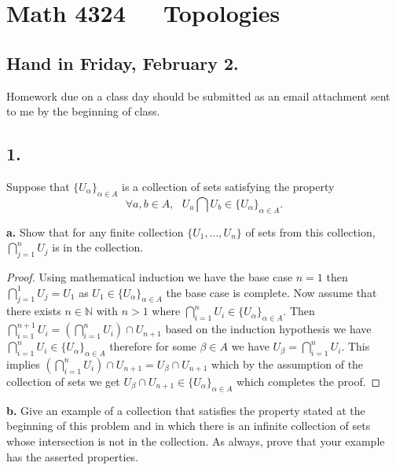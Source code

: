 \documentclass{amsart}
\theoremstyle{plain}
\theoremstyle{definition}
\theoremstyle{remark}
\begin{document}
\section*{Math 4324\ \ \  Topologies }

\subsection*{Hand in Friday, February 2.} Homework due on a class day should be submitted as an email attachment sent to me by the beginning of class.



\vspace{.15in}


\noindent
\subsection*{1.}  Suppose that $\{ U_{\alpha} \} _{\alpha \in A}$ is a collection of sets satisfying the property
\[
    \forall a, b \in A, \ \ \ U_a \bigcap U_b \in \{ U_{\alpha} \} _{\alpha \in A}.
\]

{\bfseries a.} Show that for any finite collection $\{ U_1, . . .  , U_n \}$ of sets from this collection,
${\displaystyle \bigcap _{j = 1} ^n U_j}$ is in the collection.

\begin{proof}
    Using mathematical induction we have the base case $n=1$ then $\bigcap_{j=1}^1U_j=U_1$ as $U_1\in \{U _\alpha\}_{\alpha \in A}$ the base case is complete. Now assume that there exists $n\in \mathbb{N}$ with $n>1$ where $\bigcap_{i=1}^{n}U_i\in \{U_\alpha\}_{\alpha\in A}$. Then $\bigcap_{i=1}^{n+1}U_i=(\bigcap_{i=1}^{n}U_i)\cap U_{n+1}$ based on the induction hypothesis we have $\bigcap_{i=1}^{n}U_i\in \{U_\alpha\}_{\alpha \in A}$ therefore for some $\beta \in A$ we have $U_{\beta}=\bigcap_{i=1}^{n}U_i$. This implies $(\bigcap_{i=1}^{n}U_i)\cap U_{n+1}=U_{\beta}\cap U_{n+1}$ which by the assumption of the collection of sets we get $U_\beta \cap U_{n+1}\in \{U_{\alpha}\}_{\alpha \in A}$ which completes the proof.
\end{proof}


{\bfseries b.} Give an example of a collection that satisfies the property stated at the beginning of this problem and in which there is an infinite collection of sets whose intersection is not in the collection. As always, prove that your example has the asserted properties.

\vspace{.1in}
\end{document}
